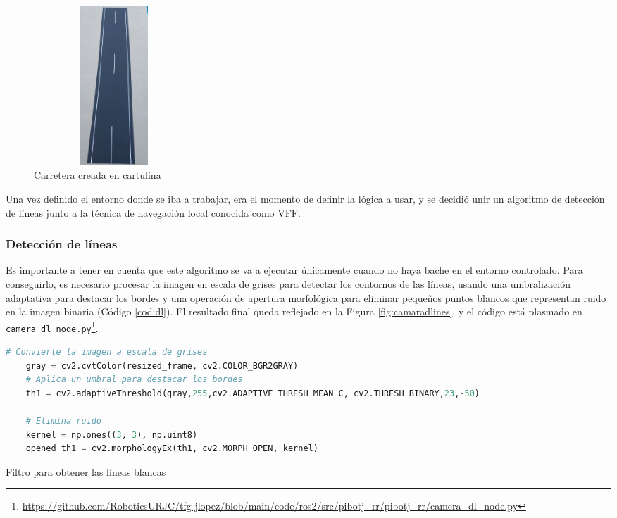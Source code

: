  \begin{figure} [h!]
	\begin{center}
		\includegraphics[width=6cm, height=6cm]{figs/cap6/carretera.png}
	\end{center}
	\caption{Carretera creada en cartulina}
	\label{fig:carreteracartulina}
\end{figure}

Una vez definido el entorno donde se iba a trabajar, era el momento de definir la lógica a usar, y se decidió unir un algoritmo de detección de líneas junto a la técnica de navegación local conocida como \ac{VFF}. 

\subsubsection{Detección de líneas}
\label{subsubsec:softwaredl}

Es importante a tener en cuenta que este algoritmo se va a ejecutar únicamente cuando no haya bache en el entorno controlado. Para conseguirlo, es necesario procesar la imagen en escala de grises para detectar los contornos de las líneas, usando una umbralización adaptativa para destacar los bordes y una operación de apertura morfológica para eliminar pequeños puntos blancos que representan ruido en la imagen binaria (Código \ref{cod:dl}). El resultado final queda reflejado en la Figura \ref{fig:camaradlines}, y el código está plasmado en \verb|camera_dl_node.py|\footnote{\url{https://github.com/RoboticsURJC/tfg-jlopez/blob/main/code/ros2/src/pibotj_rr/pibotj_rr/camera_dl_node.py}}.


\begin{code}[h]
	\begin{lstlisting}[language=Python]
	# Convierte la imagen a escala de grises
	gray = cv2.cvtColor(resized_frame, cv2.COLOR_BGR2GRAY)
	# Aplica un umbral para destacar los bordes
	th1 = cv2.adaptiveThreshold(gray,255,cv2.ADAPTIVE_THRESH_MEAN_C, cv2.THRESH_BINARY,23,-50)
		
	# Elimina ruido
	kernel = np.ones((3, 3), np.uint8) 
	opened_th1 = cv2.morphologyEx(th1, cv2.MORPH_OPEN, kernel)
	\end{lstlisting}
	\caption[Filtro para obtener las líneas blancas]{Filtro para obtener las líneas blancas}
	\label{cod:dl}
\end{code}


